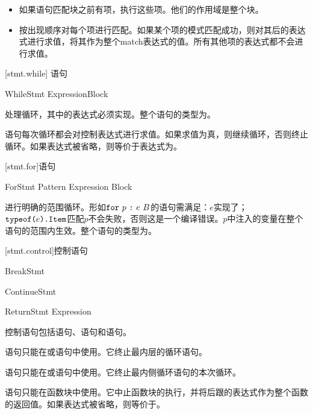 \begin{itemize}
    \item 如果语句匹配块之前有项，执行这些项。他们的作用域是整个块。
    \item 按出现顺序对每个项进行匹配。如果某个项的模式匹配成功，则对其后的表达式进行求值，将其作为整个match表达式的值。所有其他项的表达式都不会进行求值。
\end{itemize}

[stmt.while]{ 语句}

\begin{bnf}{WhileStmt}
     Expression\bnfq Block
\end{bnf}

\pnum
{}处理循环，其中的表达式必须实现。整个语句的类型为。

\pnum
{}语句每次循环都会对控制表达式进行求值。如果求值为真，则继续循环，否则终止循环。如果表达式被省略，则等价于表达式为。

[stmt.for]{语句}

\begin{bnf}{ForStmt}
     Pattern \terminal{:} Expression Block
\end{bnf}

\pnum
{}进行明确的范围循环。形如$\tcode{for}\ p\ \tcode{:}\ e\ B$的语句需满足：$e$实现了；$\texttt{typeof(}e\texttt{).Item}$匹配$p$不会失败，否则这是一个编译错误。$p$中注入的变量在整个语句的范围内生效。整个语句的类型为。

[stmt.control]{控制语句}

\begin{bnf}{BreakStmt}
     \terminal{;}
\end{bnf}

\begin{bnf}{ContinueStmt}
     \terminal{;}
\end{bnf}

\begin{bnf}{ReturnStmt}
     Expression\bnfq \terminal{;}
\end{bnf}

\pnum
控制语句包括语句、语句和语句。

\pnum
{}语句只能在或语句中使用。它终止最内层的循环语句。

\pnum
{}语句只能在或语句中使用。它终止最内侧循环语句的本次循环。

\pnum
{}语句只能在函数块中使用。它中止函数块的执行，并将后跟的表达式作为整个函数的返回值。如果表达式被省略，则等价于\tcode{()}。
